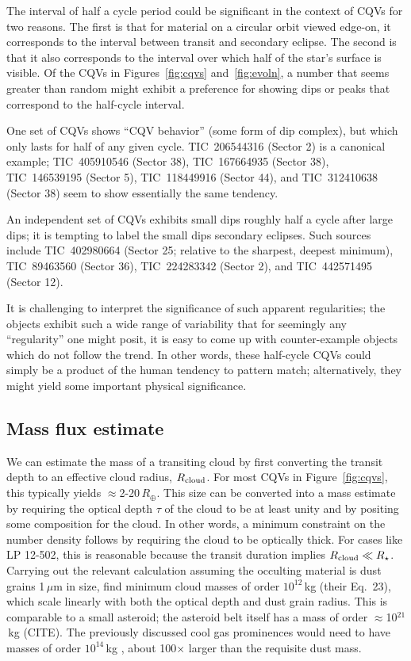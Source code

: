 \documentclass[11pt,twocolumn,tighten]{aastex63}
\begin{document}
The interval of half a cycle period could be significant in the
context of CQVs for two reasons.  The first is that for material on a
circular orbit viewed edge-on, it corresponds to the interval between
transit and secondary eclipse.  The second is that it also corresponds
to the interval over which half of the star's surface is visible.  Of
the CQVs in Figures~\ref{fig:cqvs} and~\ref{fig:evoln}, a number that
seems greater than random might exhibit a preference for showing dips
or peaks that correspond to the half-cycle interval.

One set of CQVs shows ``CQV behavior'' (some form of dip complex), but
which only lasts for half of any given cycle.  TIC~206544316 (Sector
2) is a canonical example; TIC~405910546 (Sector 38), TIC~167664935
(Sector 38), TIC~146539195 (Sector 5), TIC~118449916 (Sector 44), and
TIC~312410638 (Sector 38) seem to show essentially the same tendency.

An independent set of CQVs exhibits small dips roughly half a cycle
after large dips; it is tempting to label the small dips secondary
eclipses.  Such sources include TIC~402980664 (Sector 25; relative to
the sharpest, deepest minimum), TIC~89463560 (Sector 36),
TIC~224283342 (Sector 2), and TIC~442571495 (Sector 12).

It is challenging to interpret the significance of such apparent
regularities;  the objects exhibit such a wide range of variability
that for seemingly any ``regularity'' one might posit, it is easy to
come up with counter-example objects which do not follow the trend.
In other words, these half-cycle CQVs could simply be a product of the
human tendency to pattern match; alternatively, they might yield some
important physical significance.



\subsection{Mass flux estimate}
\label{subsec:massflux}

We can estimate the mass of a transiting cloud by first converting the
transit depth to an effective cloud radius, $R_{\rm cloud}$.  For most
CQVs in Figure~\ref{fig:cqvs}, this typically yields $\approx$2-20\,$R_\oplus$.
This size can be converted into a mass estimate by requiring the
optical depth $\tau$ of the cloud to be at least unity and by positing
some composition for the cloud.  In other
words, a minimum constraint on the number density follows by
requiring the cloud to be optically thick.  For cases like LP 12-502,
this is reasonable because the transit duration implies $R_{\rm
cloud}\ll R_\star$.  Carrying out the relevant calculation assuming
the occulting material is dust grains 1\,$\mu$m in size,
\citet{2023MNRAS.518.4734S} find minimum cloud masses of order
$10^{12}$\,kg (their Eq.~23), which scale linearly with both the
optical depth and dust grain radius.  This is comparable to a
small asteroid; the asteroid belt itself has a mass of
order $\approx$10$^{21}$\,kg (CITE).  
The previously discussed cool gas prominences would need to have
masses of order $10^{14}$\,kg \citep{1990MNRAS.247..415C}, about
100$\times$ larger than the requisite dust mass.
\end{document}
